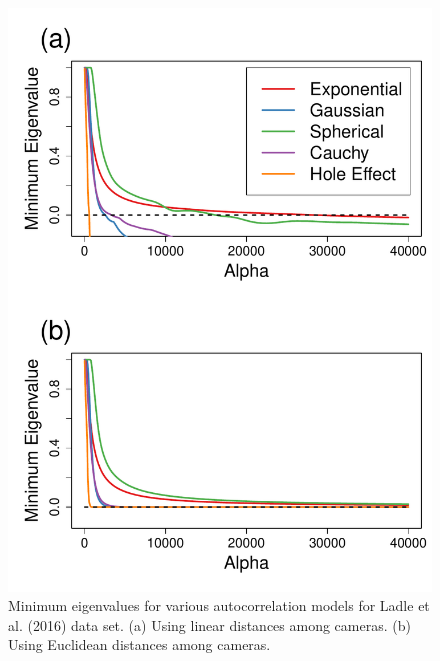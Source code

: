 \documentclass[11pt, titlepage]{article}\usepackage[]{graphicx}\usepackage[]{color}
\begin{document}
\begin{spacing}{1.9}
\begin{flushleft}
\begin{singlespace}
	\begin{figure}[H]
	  \begin{center}
	    \includegraphics[width=.7\linewidth]{figure/Fig-realDatEigVals-1.pdf}
	  \end{center}
	  \caption{Minimum eigenvalues for various autocorrelation models for Ladle et al. (2016) data set. (a) Using linear distances among cameras. (b) Using Euclidean distances among cameras.  \label{fig:realLinDistEigVals}}
  \end{figure}




\end{singlespace}
\end{flushleft}
\end{spacing}
\end{document}
